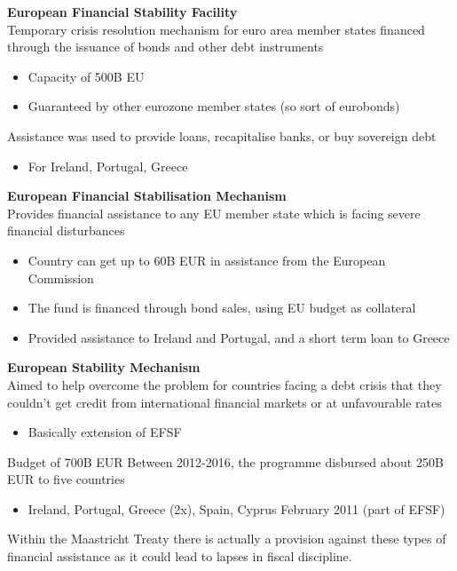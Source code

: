 \documentclass{beamer}
\begin{document}
\begin{frame}
  \textbf{European Financial Stability Facility}\\
  Temporary crisis resolution mechanism for euro area member states financed through the issuance of bonds and other debt instruments
  \begin{itemize}
    \item Capacity of 500B EU
    \item Guaranteed by other eurozone member states (so sort of eurobonds)
  \end{itemize}
    \medskip
   Assistance was used to provide loans, recapitalise banks, or buy sovereign debt    
   \begin{itemize}
     \item For Ireland, Portugal, Greece
   \end{itemize}
\end{frame}

\begin{frame}
  \textbf{European Financial Stabilisation Mechanism}\\
   Provides financial assistance to any EU member state which is facing severe financial disturbances
   \begin{itemize}
     \item Country can get up to 60B EUR in assistance from the European Commission 
     \item The fund is financed through  bond sales, using EU budget as collateral    
    \item Provided assistance to Ireland and Portugal, and a short term loan to Greece
   \end{itemize}
\end{frame}

\begin{frame}
  \textbf{European Stability Mechanism}\\
  Aimed to help overcome the problem for countries facing a debt crisis that they couldn't get credit from international financial markets or at unfavourable rates
  \begin{itemize}
    \item Basically extension of EFSF
  \end{itemize}
  Budget of 700B EUR
  Between 2012-2016, the programme disbursed about 250B EUR to five countries
\begin{itemize}
  \item Ireland, Portugal, Greece (2x), Spain, Cyprus February 2011 (part of EFSF)
\end{itemize}
Within the Maastricht Treaty there is actually a provision against these types of financial assistance as it could lead to lapses in fiscal discipline. 
\end{frame}
\end{document}

